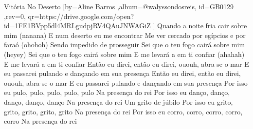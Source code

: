 \beginsong
{Vitória No Deserto %
}[by={Aline Barros %
},album={@walyssondosreis},
id={GB0129 %
},rev={0}, %
qr={https://drive.google.com/open?id=1FE1BVpp5dl4MRLgudpjRV4QAuJNWAGiZ %
}]
\beginverse*
Quando a noite fria cair sobre mim (nanana)
E num deserto eu me encontrar
Me ver cercado por egípcios e por faraó (ohohoh)
Sendo impedido de prosseguir
\endverse
\beginverse*
Sei que o teu fogo cairá sobre mim (heyey)
Sei que o teu fogo cairá sobre mim
E me levará a em ti confiar (ahahah)
E me levará a em ti confiar
\endverse
\beginchorus
Então eu direi, então eu direi, ououh, abra-se o mar
E eu passarei pulando e dançando em sua presença
Então eu direi, então eu direi, ououh, abra-se o mar
E eu passarei pulando e dançando em sua presença
\endchorus
\beginverse*
Por isso eu pulo, pulo, pulo, pulo, pulo
Na presença do rei
Por isso eu danço, danço, danço, danço, danço
Na presença do rei
Um grito de júbilo
Por isso eu grito, grito, grito, grito, grito
Na presença do rei
Por isso eu corro, corro, corro, corro, corro
Na presença do rei
\endverse

\begin{comment}
\lstset{basicstyle=\scriptsize\bf} %
\tab{Solo 1}
\begin{lstlisting}
E|-----------------------------------------------------|
B|-----------------------------------------------------|
G|-----------------------------------------------------|
D|-----------------------------------------------------|
A|-----------------------------------------------------|
E|-----------------------------------------------------|
\end{lstlisting}
\end{comment}
 
